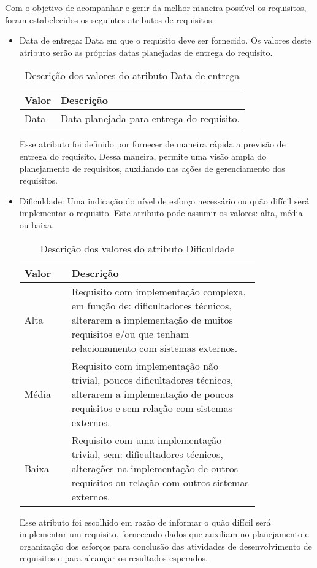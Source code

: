 Com o objetivo de acompanhar e gerir da melhor maneira possível os requisitos, foram estabelecidos os seguintes atributos de requisitos:
\begin{itemize}
\item Data de entrega:
Data em que o requisito deve ser fornecido. Os valores deste atributo serão as próprias datas planejadas de entrega do requisito.

\begin{table}[h]
\centering
\caption{Descrição dos valores do atributo Data de entrega}
\label{Rotulo}
\begin{tabular}{|l|l|}
\hline
\textbf{Valor} & \textbf{Descrição} \\
\hline
Data & Data planejada para entrega do requisito. \\ \hline
\end{tabular}
\end{table}

Esse atributo foi definido por fornecer de maneira rápida a previsão de entrega do requisito. Dessa maneira, permite uma visão ampla do planejamento de requisitos, auxiliando nas ações de gerenciamento dos requisitos.
\item Dificuldade:
Uma indicação do nível de esforço necessário ou quão difícil será implementar o requisito. Este atributo pode assumir os valores: alta, média ou baixa.

\begin{table}[h]
\centering
\caption{Descrição dos valores do atributo Dificuldade}
\label{Rotulo}
\begin{tabular}{ | l | p{0.8\linewidth} | }
\hline
\textbf{Valor} & \textbf{Descrição} \\ \hline
Alta  &  Requisito com implementação complexa, em função de: dificultadores técnicos, alterarem a implementação de muitos requisitos e/ou que tenham relacionamento com sistemas externos. \\ \hline
Média & Requisito com implementação não trivial, poucos dificultadores técnicos, alterarem a implementação de poucos requisitos e sem relação com sistemas externos. \\ \hline
Baixa & Requisito com uma implementação trivial, sem: dificultadores técnicos, alterações na implementação de outros requisitos ou relação com outros sistemas externos. \\ \hline
\end{tabular}
\end{table}

Esse atributo foi escolhido em razão de informar o quão difícil será implementar um requisito, fornecendo dados que auxiliam no planejamento e organização dos esforços para conclusão das atividades de desenvolvimento de requisitos e para alcançar os resultados esperados.


\end{itemize}
